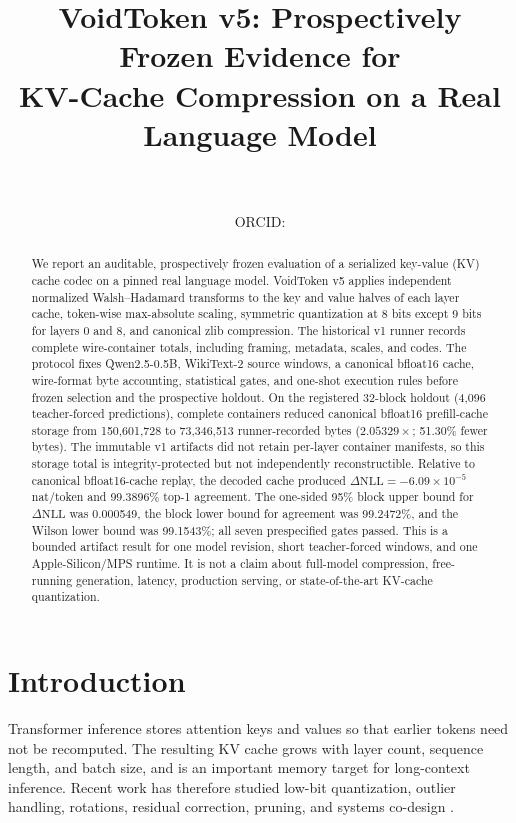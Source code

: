 \documentclass[10pt,twocolumn]{article}
\title{\textbf{VoidToken v5: Prospectively Frozen Evidence for\\
KV-Cache Compression on a Real Language Model}}
\author{\PaperAuthor\\
  \small \PaperAffiliation\\
  \small ORCID: \href{https://orcid.org/\PaperORCID}{\PaperORCID}\\
  \small \href{\PaperRepository}{\PaperRepository}}
\date{}
\newcommand{\dNLL}{\Delta\mathrm{NLL}}
\begin{document}
\maketitle

\begin{abstract}
We report an auditable, prospectively frozen evaluation of a serialized
key-value (KV) cache codec on a pinned real language model. VoidToken v5
applies independent normalized Walsh--Hadamard transforms to the key and value
halves of each layer cache, token-wise max-absolute scaling, symmetric
quantization at 8 bits except 9 bits for layers 0 and 8, and canonical zlib
compression. The historical v1 runner records complete wire-container totals,
including framing, metadata, scales, and codes. The protocol fixes
Qwen2.5-0.5B, WikiText-2
source windows, a canonical bfloat16 cache, wire-format byte accounting,
statistical gates, and one-shot execution rules before frozen selection and
the prospective holdout. On the registered
32-block holdout (4,096 teacher-forced predictions), complete containers
reduced canonical bfloat16 prefill-cache storage from 150,601,728 to
73,346,513 runner-recorded bytes ($2.05329\times$; 51.30\% fewer bytes).
The immutable v1 artifacts did not retain per-layer container manifests, so
this storage total is integrity-protected but not independently reconstructible.
Relative to canonical
bfloat16-cache replay, the decoded cache produced $\dNLL=-6.09\times10^{-5}$
nat/token and 99.3896\% top-1 agreement. The one-sided 95\% block upper bound
for $\dNLL$ was 0.000549, the block lower bound for agreement was 99.2472\%,
and the Wilson lower bound was 99.1543\%; all seven prespecified gates passed.
This is a bounded artifact result for one model revision, short
teacher-forced windows, and one Apple-Silicon/MPS runtime. It is not a claim
about full-model compression, free-running generation, latency, production
serving, or state-of-the-art KV-cache quantization.
\end{abstract}

\section{Introduction}

Transformer inference stores attention keys and values so that earlier tokens
need not be recomputed. The resulting KV cache grows with layer count, sequence
length, and batch size, and is an important memory target for long-context
inference. Recent work has therefore studied low-bit quantization, outlier
handling, rotations, residual correction, pruning, and systems co-design
\cite{liu2024kivi,hooper2024kvquant,kang2024gear,jia2026saw}.
\end{document}
